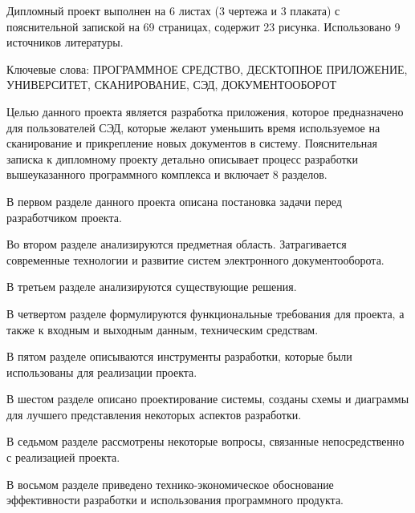 \thispagestyle{empty}


Дипломный проект выполнен на 6 листах (3 чертежа и 3 плаката) с пояснительной запиской на 69 страницах, содержит 23 рисунка. Использовано 9 источников литературы.

Ключевые слова:
\MakeUppercase{Программное средство, десктопное приложение, университет, сканирование, СЭД, документооборот}

Целью данного проекта является разработка приложения, которое предназначено для пользователей СЭД, которые желают уменьшить время используемое на сканирование и прикрепление новых документов в систему. Пояснительная записка к дипломному проекту детально описывает процесс разработки
вышеуказанного программного комплекса и включает 8 разделов.

В первом разделе данного проекта описана постановка задачи перед
разработчиком проекта.

Во втором разделе анализируются предметная область. Затрагивается
современные технологии и развитие систем электронного документооборота.

В третьем разделе анализируются существующие решения.

В четвертом разделе формулируются функциональные требования для
проекта, а также к входным и выходным данным, техническим средствам.

В пятом разделе описываются инструменты разработки, которые были
использованы для реализации проекта.

В шестом разделе описано проектирование системы, созданы схемы и  диаграммы для лучшего представления некоторых аспектов разработки.

В седьмом разделе рассмотрены некоторые вопросы, связанные
непосредственно с реализацией проекта.

В восьмом разделе приведено технико-экономическое обоснование
эффективности разработки и использования программного продукта.